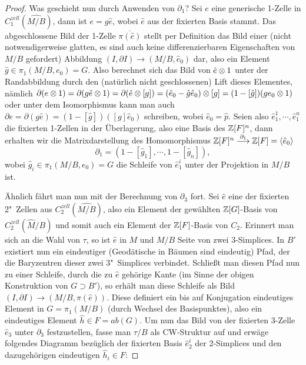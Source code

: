 \begin{proof}
	Was geschieht nun durch Anwenden von $\partial_1$? Sei $e$ eine generische 1-Zelle in $C_1^{zell}(\widehat{ M/B})$, dann ist $e=g\hat e$, wobei $\hat e$ aus der fixierten Basis stammt. Das abgeschlossene Bild der 1-Zelle $\overline{\pi(\hat e)}$ stellt per Definition das Bild einer (nicht notwendigerweise glatten, es sind auch keine differenzierbaren Eigenschaften von $M/B$ gefordert) Abbildung $(I,\partial I) \to (M/B,\hat e_0)$ dar, also ein Element $\hat g \in \pi_1(M/B,e_0) = G$. Also berechnet sich das Bild von $\hat e \otimes 1$ unter der Randabbildung durch den (natürlich nicht geschlossenen) Lift dieses Elementes, nämlich $\partial(e\otimes 1)=\partial(g \hat e \otimes 1) = \partial(\hat e \otimes [g])= (\hat e_0 - \hat g \hat e_0)\otimes [g] = (1-[\hat g]) (ge_0\otimes 1)$ oder unter dem Isomorphismus kann man auch $\partial e = \partial(g\hat e)= (1-[\hat g])([g]\hat e_0) $ schreiben, wobei $\hat e_0=\hat p$. Seien also $\hat e_1^1 ,\cdots, \hat e_1^n$ die fixierten 1-Zellen in der Überlagerung, also eine Basis des $\mathbb{Z}[F]^n$, dann erhalten wir die Matrixdarstellung des Homomorphismus $\mathbb{Z}[F]^n \stackrel {\partial_1} \longrightarrow \mathbb{Z}[F]=\langle \hat e_0\rangle$
	\[
		\partial_1 = (1-[\hat g_1], \cdots , 1- [\hat g_n]) ,
	\]
	wobei $\hat g_i \in \pi_1(M/B,e_0)=G$ die Schleife von $\hat e_1^i$ unter der Projektion in $M/B$ ist.

	Ähnlich fährt man nun mit der Berechnung von $\partial_3$ fort. Sei $\hat e$ eine der fixierten 2"~Zellen aus $C_2^{zell}(\widehat{ M/B})$, also ein Element der gewählten $\mathbb{Z}[G]$-Basis von $C_2^{zell}(\widehat M/B)$ und somit auch ein Element der $\mathbb{Z}[F]$-Basis von $C_2$. Erinnert man sich an die Wahl von $\tau$, so ist $\hat e$ in $M$ und $M/B$ Seite von zwei 3-Simplices. In $B'$ existiert nun ein eindeutiger (Geodätische in Bäumen sind eindeutig) Pfad, der die Baryzentren dieser zwei 3"~Simplices verbindet. Schließt man diesen Pfad nun zu einer Schleife, durch die zu $\hat e$ gehörige Kante (im Sinne der obigen Konstruktion von $G\supset B'$), so erhält man diese Schleife als Bild $(I,\partial I) \to (M/B,\pi(\hat e))$. Diese definiert ein bis auf Konjugation eindeutiges Element in $G=\pi_1(M/B)$ (durch Wechsel des Basispunktes), also ein eindeutiges Element $\hat h \in F =ab(G)$. Um nun das Bild von der fixierten 3-Zelle $\hat e_3$ unter $\partial_3$ festzustellen, fasse man $\tau/B$ als CW-Struktur auf und erwäge folgendes Diagramm bezüglich der fixierten Basis $\hat e_2^i$ der 2-Simplices und den dazugehörigen eindeutigen $\hat h_i \in F$:
	

\end{proof}
